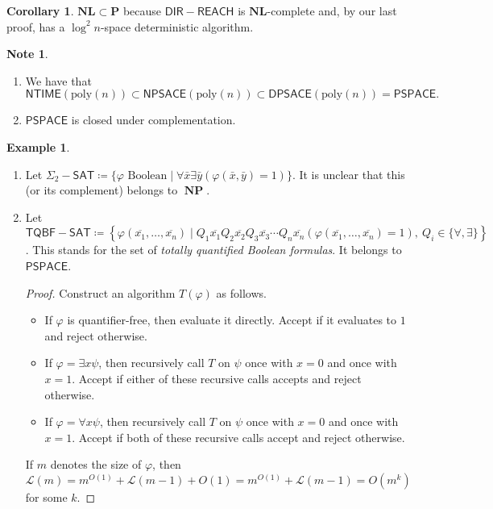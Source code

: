 \documentclass[10pt,letterpaper,cm]{nupset}
\theoremstyle{definition}
\newtheorem{exmp}[definition]{Example}
\newtheorem{note}[definition]{Note}
\theoremstyle{theorem}
\newtheorem{corollary}[definition]{Corollary}
\theoremstyle{remark}
\newcommand{\1}{\mathbf{1}}
\newcommand{\0}{\vec 0}
\DeclareMathOperator{\NP}{\mathbf{NP}}
\begin{document}
\begin{corollary}
$\mathbf{NL} \subset \mathbf{P}$ because $\mathsf{DIR{-}REACH}$ is  $\mathbf{NL}$-complete and, by our last proof, has a $\log^2{n}$-space deterministic algorithm.
\end{corollary}

\begin{note} $ $
\begin{enumerate}
\item We have that $\mathsf{NTIME}(\text{poly}(n)) \subset \mathsf{NPSACE}(\text{poly}(n)) \subset \mathsf{DPSACE}(\text{poly}(n)) = \mathsf{PSPACE}.$
\item $\mathsf{PSPACE}$ is closed under complementation. 
\end{enumerate}
\end{note}

\begin{exmp} $ $
\begin{enumerate}
\item Let $\Sigma_2{-}\mathsf{SAT} \coloneqq \{\varphi \text{ Boolean} \mid \forall \bar{x} \exists \bar{y}(\varphi(\bar{x}, \bar{y}) = 1)\}$. It is unclear that this (or its complement) belongs to $\NP$. 
\item Let $\mathsf{TQBF{-}SAT} \coloneqq \left\{ \varphi(\overline{x_1}, \ldots, \overline{x_n}) \mid Q_1 \overline{x_1} Q_2 \overline{x_2}Q_3 \overline{x_3} \cdots Q_n \overline{x_n} (\varphi(\overline{x_1}, \ldots, \overline{x_n}) = 1), \ Q_i \in \{\forall, \exists\} \right\}$. This stands for the set of \textit{totally quantified Boolean formulas}. It belongs to $\mathsf{PSPACE}$.
\begin{proof}
Construct an algorithm $T(\varphi)$ as follows. 
\begin{itemize}
\item If $\varphi$ is quantifier-free, then evaluate it directly. Accept if it evaluates to $1$ and reject otherwise. 
\item If $\varphi = \exists x \psi$, then recursively call $T$ on $\psi$ once with $x=0$ and once with $x=1$. Accept if either of these recursive calls accepts and reject otherwise. 
\item If  $\varphi = \forall x \psi$, then recursively call $T$ on $\psi$ once with $x=0$ and once with $x=1$. Accept if both of these recursive calls accept and reject otherwise. 
\end{itemize} 
If $m$ denotes the size of $\varphi$, then $\mathcal{L}(m) = m^{O(1)} + \mathcal{L}(m-1) + O(1) = m^{O(1)} + \mathcal{L}(m-1) = O(m^k)$ for some $k$.
\end{proof}
\end{enumerate}
\end{exmp}
\end{document}
